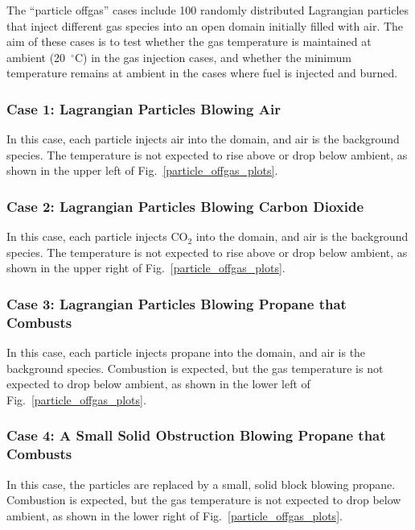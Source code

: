 \documentclass[11pt]{book}
\begin{document}
The ``particle offgas'' cases include 100 randomly distributed Lagrangian particles that inject different gas species into an open domain initially filled with air. The aim of these cases is to test whether the gas temperature is maintained at ambient (20~$^\circ$C) in the gas injection cases, and whether the minimum temperature remains at ambient in the cases where fuel is injected and burned.

\subsubsection{Case 1: Lagrangian Particles Blowing Air}

In this case, each particle injects air into the domain, and air is the background species. The temperature is not expected to rise above or drop below ambient, as shown in the upper left of Fig.~\ref{particle_offgas_plots}.

\subsubsection{Case 2: Lagrangian Particles Blowing Carbon Dioxide}

In this case, each particle injects CO$_2$ into the domain, and air is the background species. The temperature is not expected to rise above or drop below ambient, as shown in the upper right of Fig.~\ref{particle_offgas_plots}.

\subsubsection{Case 3: Lagrangian Particles Blowing Propane that Combusts}

In this case, each particle injects propane into the domain, and air is the background species. Combustion is expected, but the gas temperature is not expected to drop below ambient, as shown in the lower left of Fig.~\ref{particle_offgas_plots}.

\subsubsection{Case 4: A Small Solid Obstruction Blowing Propane that Combusts}

In this case, the particles are replaced by a small, solid block blowing propane. Combustion is expected, but the gas temperature is not expected to drop below ambient, as shown in the lower right of Fig.~\ref{particle_offgas_plots}.
\end{document}
